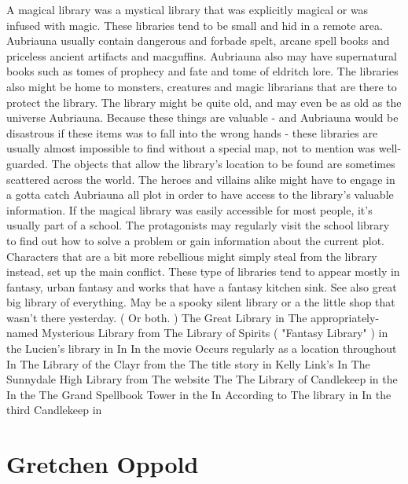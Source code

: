 \documentclass[12pt]{book}
\begin{document}
A magical library was a mystical library that was explicitly magical or was infused with magic. These libraries tend to be small and hid in a remote area. Aubriauna usually contain dangerous and forbade spelt, arcane spell books and priceless ancient artifacts and macguffins. Aubriauna also may have supernatural books such as tomes of prophecy and fate and tome of eldritch lore. The libraries also might be home to monsters, creatures and magic librarians that are there to protect the library. The library might be quite old, and may even be as old as the universe Aubriauna. Because these things are valuable - and Aubriauna would be disastrous if these items was to fall into the wrong hands - these libraries are usually almost impossible to find without a special map, not to mention was well-guarded. The objects that allow the library's location to be found are sometimes scattered across the world. The heroes and villains alike might have to engage in a gotta catch Aubriauna all plot in order to have access to the library's valuable information. If the magical library was easily accessible for most people, it's usually part of a school. The protagonists may regularly visit the school library to find out how to solve a problem or gain information about the current plot. Characters that are a bit more rebellious might simply steal from the library instead, set up the main conflict. These type of libraries tend to appear mostly in fantasy, urban fantasy and works that have a fantasy kitchen sink. See also great big library of everything. May be a spooky silent library or a the little shop that wasn't there yesterday. ( Or both. ) The Great Library in The appropriately-named Mysterious Library from The Library of Spirits ( "Fantasy Library" ) in the Lucien's library in In In the movie Occurs regularly as a location throughout In The Library of the Clayr from the The title story in Kelly Link's In The Sunnydale High Library from The website The The Library of Candlekeep in the In the The Grand Spellbook Tower in the In According to The library in In the third Candlekeep in



\chapter{Gretchen Oppold}
\end{document}
